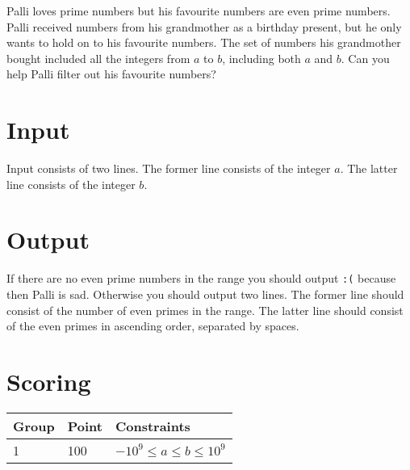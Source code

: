 
Palli loves prime numbers but his favourite numbers are even prime numbers.
Palli received numbers from his grandmother as a birthday present,
but he only wants to hold on to his favourite numbers.
The set of numbers his grandmother bought included all the integers from $a$ to $b$, including both $a$ and $b$.
Can you help Palli filter out his favourite numbers?

\section*{Input}
Input consists of two lines.
The former line consists of the integer $a$.
The latter line consists of the integer $b$.

\section*{Output}
If there are no even prime numbers in the range you should output \texttt{:(} because then Palli is sad.
Otherwise you should output two lines.
The former line should consist of the number of even primes in the range.
The latter line should consist of the even primes in ascending order, separated by spaces.

\section*{Scoring}
\begin{tabular}{|l|l|l|}
\hline
Group & Point & Constraints \\ \hline
1     & 100   & $-10^9 \leq a \leq b \leq 10^9$ \\ \hline
\end{tabular}

